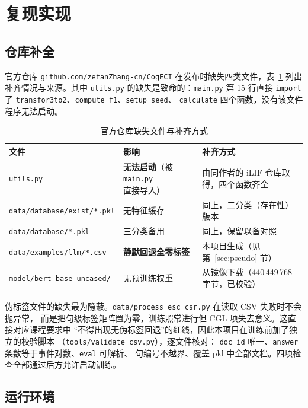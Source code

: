 \section{复现实现}
\label{sec:impl}

\subsection{仓库补全}

官方仓库 \texttt{github.com/zefanZhang-cn/CogECI} 在发布时缺失四类文件，表~\ref{tab:missing}
列出补齐情况与来源。其中 \texttt{utils.py} 的缺失是致命的：\texttt{main.py} 第 15 行直接
\texttt{import} 了 \texttt{transfor3to2}、\texttt{compute\_f1}、\texttt{setup\_seed}、
\texttt{calculate} 四个函数，没有该文件程序无法启动。

\begin{table}[H]
\centering
\caption{官方仓库缺失文件与补齐方式}
\label{tab:missing}
\small
\begin{tabularx}{\textwidth}{@{}l l X@{}}
\toprule
文件 & 影响 & 补齐方式\\
\midrule
\texttt{utils.py} & \textbf{无法启动}（被 \texttt{main.py} 直接导入） & 由同作者的 iLIF 仓库取得，四个函数齐全\\
\texttt{data/database/exist/*.pkl} & 无特征缓存 & 同上，二分类（存在性）版本\\
\texttt{data/database/*.pkl} & 三分类备用 & 同上，保留以备对照\\
\texttt{data/examples/llm/*.csv} & \textbf{静默回退全零标签} & 本项目生成（见第~\ref{sec:pseudo} 节）\\
\texttt{model/bert-base-uncased/} & 无预训练权重 & 从镜像下载（440\,449\,768 字节，已校验）\\
\bottomrule
\end{tabularx}
\end{table}

伪标签文件的缺失最为隐蔽。\texttt{data/process\_esc\_csr.py} 在读取 CSV 失败时不会抛异常，
而是把句级标签矩阵置为零，训练照常进行但 CGL 项失去意义。这直接对应课程要求中
“不得出现无伪标签回退”的红线，因此本项目在训练前加了独立的校验脚本
（\texttt{tools/validate\_csv.py}），逐文件核对：
\texttt{doc\_id} 唯一、\texttt{answer} 条数等于事件对数、\texttt{eval} 可解析、
句编号不越界、覆盖 pkl 中全部文档。四项检查全部通过后方允许启动训练。

\subsection{运行环境}

